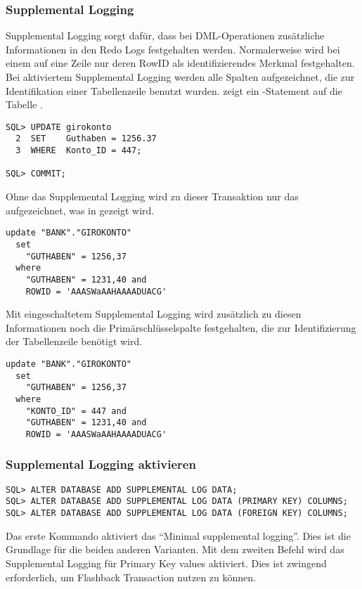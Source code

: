         \subsubsection{Supplemental Logging}
          Supplemental Logging sorgt daf\"ur, dass bei DML-Operationen zus\"atzliche Informationen in den Redo Logs festgehalten werden. Normalerweise wird bei einem  auf eine Zeile nur deren RowID als identifizierendes Merkmal festgehalten. Bei aktiviertem Supplemental Logging werden alle Spalten aufgezeichnet, die zur Identifikation einer Tabellenzeile benutzt wurden.  zeigt ein -Statement auf die Tabelle .
          \begin{lstlisting}[caption={Supplemental Logging - Demo Schritt 1},label=admin1703,language=oracle_sql]
SQL> UPDATE girokonto
  2  SET    Guthaben = 1256.37
  3  WHERE  Konto_ID = 447;

SQL> COMMIT;
          \end{lstlisting}
          Ohne das Supplemental Logging wird zu dieser Transaktion nur das aufgezeichnet, was in  gezeigt wird.
          \begin{lstlisting}[caption={Supplemental Logging - Demo Schritt 2 },label=admin1704,language=oracle_sql]
update "BANK"."GIROKONTO"
  set
    "GUTHABEN" = 1256,37
  where
    "GUTHABEN" = 1231,40 and
    ROWID = 'AAASWaAAHAAAADUACG'
          \end{lstlisting}
          Mit eingeschaltetem Supplemental Logging wird zus\"atzlich zu diesen Informationen noch die Prim\"arschl\"usselspalte festgehalten, die zur Identifizierung der Tabellenzeile ben\"otigt wird.
          \begin{lstlisting}[caption={Supplemental Logging - Demo Schritt 3},label=admin1705,language=oracle_sql]
update "BANK"."GIROKONTO"
  set
    "GUTHABEN" = 1256,37
  where
    "KONTO_ID" = 447 and
    "GUTHABEN" = 1231,40 and
    ROWID = 'AAASWaAAHAAAADUACG'
          \end{lstlisting}
        \subsubsection{Supplemental Logging aktivieren}
          \begin{lstlisting}[caption={Supplemental Logging},label=admin1706,language=oracle_sql]
SQL> ALTER DATABASE ADD SUPPLEMENTAL LOG DATA;
SQL> ALTER DATABASE ADD SUPPLEMENTAL LOG DATA (PRIMARY KEY) COLUMNS;
SQL> ALTER DATABASE ADD SUPPLEMENTAL LOG DATA (FOREIGN KEY) COLUMNS;
          \end{lstlisting}
          Das erste Kommando aktiviert das \enquote{Minimal supplemental logging}. Dies ist die Grundlage f\"ur die beiden anderen Varianten. Mit dem zweiten Befehl wird das Supplemental Logging f\"ur Primary Key values aktiviert. Dies ist zwingend erforderlich, um Flashback Transaction nutzen zu k\"onnen.

